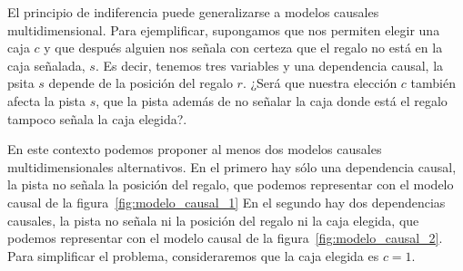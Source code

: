 \documentclass[a4paper,10pt]{book}
\theoremstyle{definition}
\begin{document}

El principio de indiferencia puede generalizarse a modelos causales multidimensional.
%
Para ejemplificar, supongamos que nos permiten elegir una caja $c$ y que despu\'es alguien nos se\~nala con certeza que el regalo no est\'a en la caja se\~nalada, $s$.
%
Es decir, tenemos tres variables y una dependencia causal, la psita $s$ depende de la posici\'on del regalo $r$.
%
¿Ser\'a que nuestra elecci\'on $c$ tambi\'en afecta la pista $s$, que la pista adem\'as de no se\~nalar la caja donde est\'a el regalo tampoco se\~nala la caja elegida?.


En este contexto podemos proponer al menos dos modelos causales multidimensionales alternativos.
%
En el primero hay s\'olo una dependencia causal, la pista no se\~nala la posici\'on del regalo, que podemos representar con el modelo causal de la figura~\ref{fig:modelo_causal_1}
%
En el segundo hay dos dependencias causales, la pista no se\~nala ni la posici\'on del regalo ni la caja elegida, que podemos representar con el modelo causal de la figura~\ref{fig:modelo_causal_2}.
%
Para simplificar el problema, consideraremos que la caja elegida es $c=1$.

\end{document}
